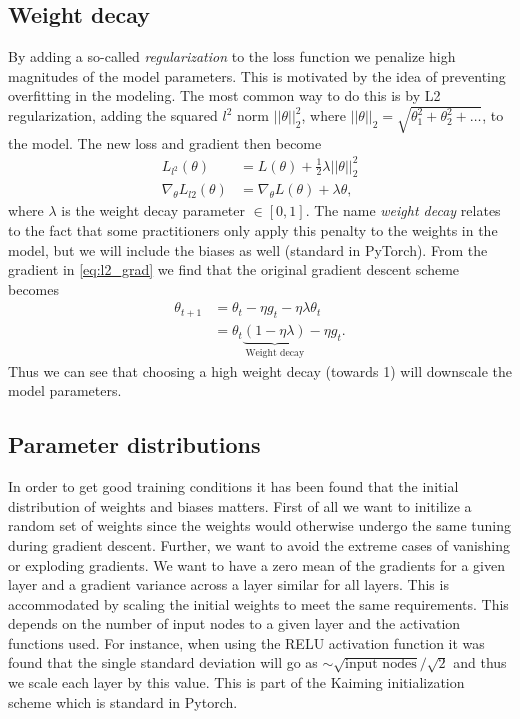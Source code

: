 %
%

\subsection{Weight decay}
By adding a so-called \textit{regularization} to the loss function we penalize high magnitudes of the model parameters. This is motivated by the idea of preventing overfitting in the modeling. The most common way to do this is by L2 regularization, adding the squared $l^2$ norm $||\theta||_2^2$, where $||\theta||_2 = \sqrt{\theta_1^2 + \theta_2^2 + \ldots}$, to the model. The new loss and gradient then become
\begin{align}
  L_{l^2}(\theta) &= L(\theta) + \frac{1}{2}\lambda ||\theta||^2_2 \nonumber \\
  \nabla_\theta L_{l2}(\theta) &=  \nabla_\theta L(\theta) + \lambda \theta,
  \label{eq:l2_grad}
\end{align}
where $\lambda$ is the weight decay parameter $\in [0,1]$. The name \textit{weight decay} relates to the fact that some practitioners only apply this penalty to the weights in the model, but we will include the biases as well (standard in PyTorch). From the gradient in \cref{eq:l2_grad} we find that the original gradient descent scheme becomes
\begin{align*}
  \theta_{t+1} &= \theta_t - \eta g_t - \eta\lambda \theta_t \\
  &= \theta_t\underbrace{(1-\eta\lambda)}_{\text{Weight decay}} - \eta g_t.
\end{align*}
Thus we can see that choosing a high weight decay (towards 1) will downscale the model parameters.  

\subsection{Parameter distributions}
In order to get good training conditions it has been found that the initial distribution of weights and biases matters. First of all we want to initilize a random set of weights since the weights would otherwise undergo the same tuning during gradient descent. Further, we want to avoid the extreme cases of vanishing or exploding gradients. We want to have a zero mean of the gradients for a given layer and a gradient variance across a layer similar for all layers. This is accommodated by scaling the initial weights to meet the same requirements. This depends on the number of input nodes to a given layer and the activation functions used. For instance, when using the RELU activation function it was found that the single standard deviation will go as $\sim \sqrt{\text{input nodes}}/\sqrt{2}$ and thus we scale each layer by this value. This is part of the Kaiming initialization scheme which is standard in Pytorch. 


